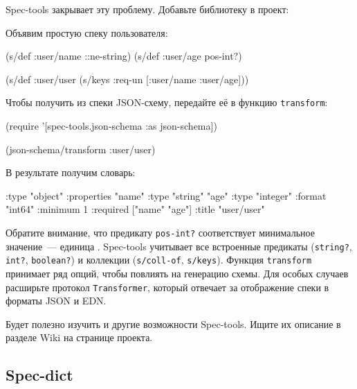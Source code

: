 Spec-tools закрывает эту проблему. Добавьте библиотеку в проект:

\begin{english}
  \begin{clojure}
  \end{clojure}
\end{english}

Объявим простую спеку пользователя:

\begin{english}
  \begin{clojure}
(s/def :user/name ::ne-string)
(s/def :user/age pos-int?)

(s/def :user/user
  (s/keys :req-un [:user/name :user/age]))
  \end{clojure}
\end{english}

Чтобы получить из спеки JSON-схему, передайте её в функцию \verb|transform|:

\begin{english}
  \begin{clojure}
(require '[spec-tools.json-schema :as json-schema])

(json-schema/transform :user/user)
  \end{clojure}
\end{english}

В результате получим словарь:

\begin{english}
  \begin{clojure/lines}
{:type "object"
 :properties
 {"name" {:type "string"}
  "age" {:type "integer"
         :format "int64"
         :minimum 1}}
 :required ["name" "age"]
 :title "user/user"}
  \end{clojure/lines}
\end{english}

Обратите внимание, что предикату \verb|pos-int?| соответствует минимальное
значение~--- единица . Spec-tools учитывает все встроенные предикаты
(\verb|string?|, \verb|int?|, \verb|boolean?|) и коллекции (\verb|s/coll-of|,
\verb|s/keys|). Функция \verb|transform| принимает ряд опций, чтобы повлиять на
генерацию схемы. Для особых случаев расширьте протокол \verb|Transformer|,
который отвечает за отображение спеки в форматы JSON и EDN.

Будет полезно изучить и другие возможности Spec-tools. Ищите их описание в
разделе Wiki на странице проекта.

\subsection{Spec-dict}

